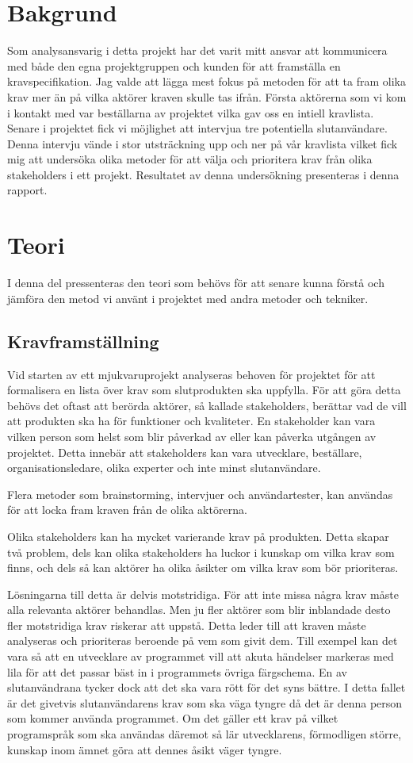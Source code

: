 \section{Bakgrund}
Som analysansvarig i detta projekt har det varit mitt ansvar att kommunicera med både den egna projektgruppen och kunden för att framställa en kravspecifikation. Jag valde att lägga mest fokus på metoden för att ta fram olika krav mer än på vilka aktörer kraven skulle tas ifrån. Första aktörerna som vi kom i kontakt med var beställarna av projektet vilka gav oss en intiell kravlista. Senare i projektet fick vi möjlighet att intervjua tre potentiella slutanvändare. Denna intervju vände i stor utsträckning upp och ner på vår kravlista vilket fick mig att undersöka olika metoder för att välja och prioritera krav från olika stakeholders i ett projekt. Resultatet av denna undersökning presenteras i denna rapport.  

\section{Teori}
I denna del pressenteras den teori som behövs för att senare kunna förstå och jämföra den metod vi använt i projektet med andra metoder och tekniker.

\subsection{Kravframställning}
Vid starten av ett mjukvaruprojekt analyseras behoven för projektet för att formalisera en lista över krav som slutprodukten ska uppfylla. För att göra detta behövs det oftast att berörda aktörer, så kallade stakeholders, berättar vad de vill att produkten ska ha för funktioner och kvaliteter. En stakeholder kan vara vilken person som helst som blir påverkad av eller kan påverka utgången av projektet. Detta innebär att stakeholders kan vara  utvecklare, beställare, organisationsledare, olika experter och inte minst slutanvändare. 

Flera metoder som brainstorming, intervjuer och användartester, kan användas för att locka fram kraven från de olika aktörerna.

Olika stakeholders kan ha mycket varierande krav på produkten. Detta skapar två problem, dels kan olika stakeholders ha luckor i kunskap om vilka krav som finns, och dels så kan aktörer ha olika åsikter om vilka krav som bör prioriteras. 

Lösningarna till detta är delvis motstridiga. För att inte missa några krav måste alla relevanta aktörer behandlas. Men ju fler aktörer som blir inblandade desto fler motstridiga krav riskerar att uppstå. Detta leder till att kraven måste analyseras och prioriteras beroende på vem som givit dem.
Till exempel kan det vara så att en utvecklare av programmet vill att akuta händelser markeras med lila för att det passar bäst in i programmets övriga färgschema. En av slutanvändrana tycker dock att det ska vara rött för det syns bättre. I detta fallet är det givetvis slutanvändarens krav som ska väga tyngre då det är denna person som kommer använda programmet. 
Om det gäller ett krav på vilket programspråk som ska användas däremot så lär utvecklarens, förmodligen större, kunskap inom ämnet göra att dennes åsikt väger tyngre.

